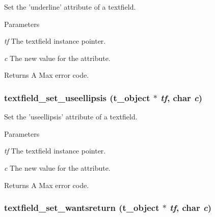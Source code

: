 Set the 'underline' attribute of a textfield. 
\begin{DoxyParams}{Parameters}
\item[{\em tf}]The textfield instance pointer. \item[{\em c}]The new value for the attribute. \end{DoxyParams}
\begin{DoxyReturn}{Returns}
A Max error code. 
\end{DoxyReturn}
\hypertarget{group__textfield_ga797da5c445484ea732cf378190795ac5}{
\subsubsection[{textfield\_\-set\_\-useellipsis}]{ textfield\_\-set\_\-useellipsis ({\bf t\_\-object} $\ast$ {\em tf}, \/  char {\em c})}}
\label{group__textfield_ga797da5c445484ea732cf378190795ac5}


Set the 'useellipsis' attribute of a textfield. 
\begin{DoxyParams}{Parameters}
\item[{\em tf}]The textfield instance pointer. \item[{\em c}]The new value for the attribute. \end{DoxyParams}
\begin{DoxyReturn}{Returns}
A Max error code. 
\end{DoxyReturn}
\hypertarget{group__textfield_ga58f4777a6d8b9a5282b16c70008ff477}{
\subsubsection[{textfield\_\-set\_\-wantsreturn}]{ textfield\_\-set\_\-wantsreturn ({\bf t\_\-object} $\ast$ {\em tf}, \/  char {\em c})}}
\label{group__textfield_ga58f4777a6d8b9a5282b16c70008ff477}



